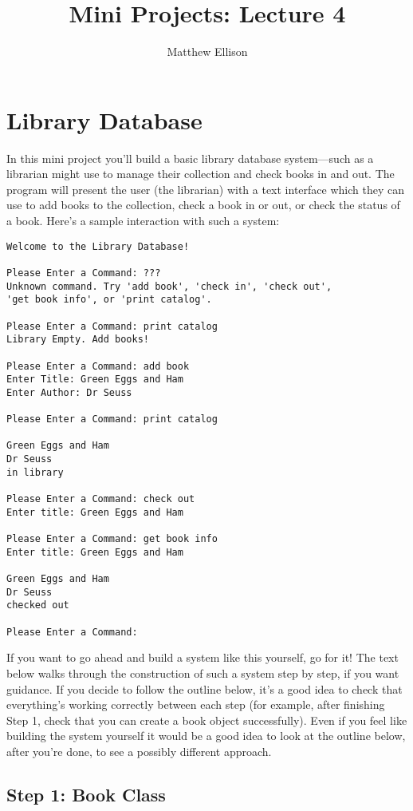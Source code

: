 \documentclass{hitec}
\title{Mini Projects: Lecture 4}
\author{Matthew Ellison}
\begin{document}
\maketitle

\section{Library Database}

In this mini project you'll build a basic library database system---such as a librarian might use to manage their collection and check books in and out.
The program will present the user (the librarian) with a text interface which they can use to add books to the collection, check a book in or out, or check the status of a book.
Here's a sample interaction with such a system:

\begin{verbatim}
Welcome to the Library Database!

Please Enter a Command: ???
Unknown command. Try 'add book', 'check in', 'check out', 
'get book info', or 'print catalog'.

Please Enter a Command: print catalog
Library Empty. Add books!

Please Enter a Command: add book
Enter Title: Green Eggs and Ham
Enter Author: Dr Seuss

Please Enter a Command: print catalog

Green Eggs and Ham
Dr Seuss
in library

Please Enter a Command: check out
Enter title: Green Eggs and Ham

Please Enter a Command: get book info
Enter title: Green Eggs and Ham

Green Eggs and Ham
Dr Seuss
checked out

Please Enter a Command: 
\end{verbatim}

\noindent If you want to go ahead and build a system like this yourself, go for it! The text below walks through the construction of such a system step by step, if you want guidance.
If you decide to follow the outline below, it's a good idea to check that everything's working correctly between each step (for example, after finishing Step 1, check that you can create
a book object successfully). Even if you feel like building the system yourself it would be a good idea to look at the outline below, after you're done, to see a possibly different approach.

\subsection{Step 1: Book Class}
\end{document}

